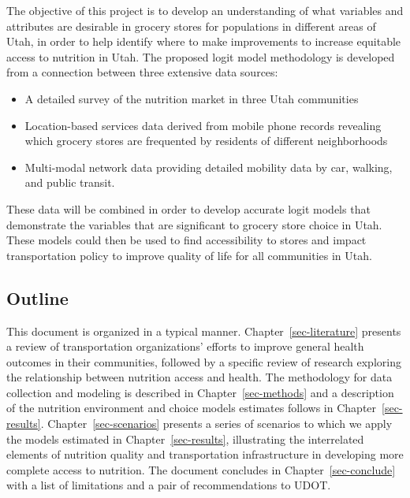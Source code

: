 \documentclass[
  letterpaper,
  authoryear,
  review,
  3p]{elsarticle}
\providecommand{\tightlist}{%
  \setlength{\itemsep}{0pt}\setlength{\parskip}{0pt}}\usepackage{longtable,booktabs,array}
\begin{document}
The objective of this project is to develop an understanding of what
variables and attributes are desirable in grocery stores for populations
in different areas of Utah, in order to help identify where to make
improvements to increase equitable access to nutrition in Utah. The
proposed logit model methodology is developed from a connection between
three extensive data sources:

\begin{itemize}
\tightlist
\item
  A detailed survey of the nutrition market in three Utah communities
\item
  Location-based services data derived from mobile phone records
  revealing which grocery stores are frequented by residents of
  different neighborhoods
\item
  Multi-modal network data providing detailed mobility data by car,
  walking, and public transit.
\end{itemize}

These data will be combined in order to develop accurate logit models
that demonstrate the variables that are significant to grocery store
choice in Utah. These models could then be used to find accessibility to
stores and impact transportation policy to improve quality of life for
all communities in Utah.

\hypertarget{outline}{%
\subsection{Outline}\label{outline}}

This document is organized in a typical manner.
Chapter~\ref{sec-literature} presents a review of transportation
organizations' efforts to improve general health outcomes in their
communities, followed by a specific review of research exploring the
relationship between nutrition access and health. The methodology for
data collection and modeling is described in Chapter~\ref{sec-methods}
and a description of the nutrition environment and choice models
estimates follows in Chapter~\ref{sec-results}.
Chapter~\ref{sec-scenarios} presents a series of scenarios to which we
apply the models estimated in Chapter~\ref{sec-results}, illustrating
the interrelated elements of nutrition quality and transportation
infrastructure in developing more complete access to nutrition. The
document concludes in Chapter~\ref{sec-conclude} with a list of
limitations and a pair of recommendations to UDOT.

\end{document}
